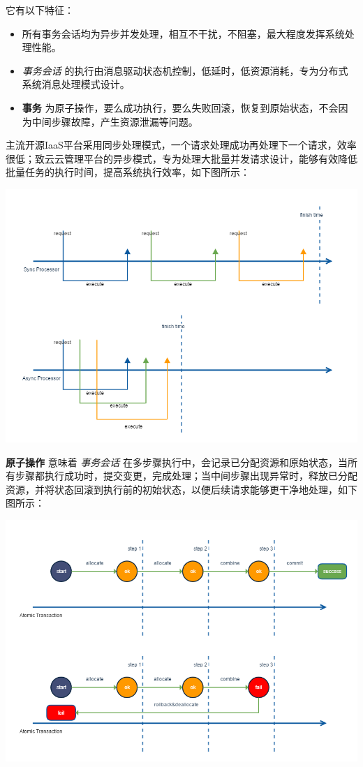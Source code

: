 \documentclass[letterpaper,10pt]{sphinxmanual}
\begin{document}
它有以下特征：
\begin{itemize}
\item {} 
所有事务会话均为异步并发处理，相互不干扰，不阻塞，最大程度发挥系统处理性能。

\item {} 
\emph{事务会话} 的执行由消息驱动状态机控制，低延时，低资源消耗，专为分布式系统消息处理模式设计。

\item {} 
\textbf{事务} 为原子操作，要么成功执行，要么失败回滚，恢复到原始状态，不会因为中间步骤故障，产生资源泄漏等问题。

\end{itemize}

主流开源IaaS平台采用同步处理模式，一个请求处理成功再处理下一个请求，效率很低；致云云管理平台的异步模式，专为处理大批量并发请求设计，能够有效降低批量任务的执行时间，提高系统执行效率，如下图所示：

\includegraphics{2_1_1_async_process.png}

\textbf{原子操作} 意味着 \emph{事务会话} 在多步骤执行中，会记录已分配资源和原始状态，当所有步骤都执行成功时，提交变更，完成处理；当中间步骤出现异常时，释放已分配资源，并将状态回滚到执行前的初始状态，以便后续请求能够更干净地处理，如下图所示：

\includegraphics{2_1_2_transaction_rollback.png}
\end{document}
